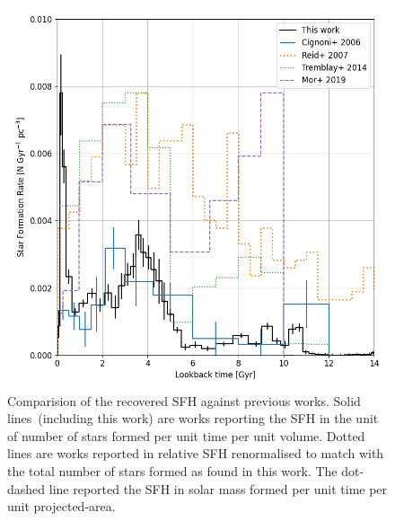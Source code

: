 \documentclass[fleqn,usenatbib]{mnras}
\begin{document}


\begin{figure}
  \includegraphics[width=\columnwidth]{figures/fig_06_compare_sfh.png}
  \caption{Comparision of the recovered SFH against previous works.
  Solid lines~(including this work)
  are works reporting the SFH in the unit of number of stars formed per
  unit time per unit volume. Dotted lines are works reported
  in relative SFH renormalised to match with the total number of stars formed
  as found in this work. The dot-dashed line reported the SFH in solar mass
  formed per unit time per unit projected-area.}
  \label{fig:comparison}
\end{figure}

\end{document}
